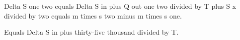 Delta S one two equals Delta S in plus Q out one two divided by T plus S x divided by two equals m times s two minus m times s one.  

Equals Delta S in plus thirty-five thousand divided by T.